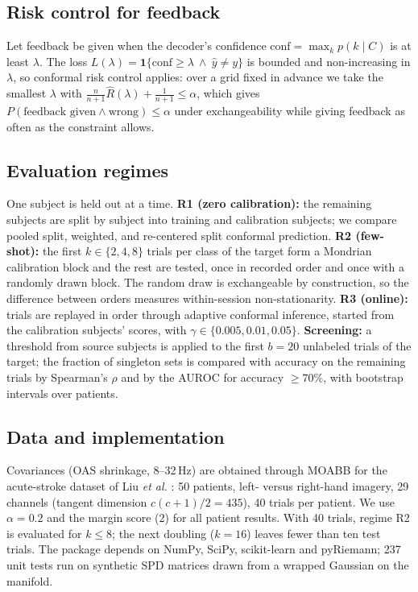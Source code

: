 \documentclass[letterpaper, 10pt, conference]{ieeeconf}
\begin{document}
\subsection{Risk control for feedback}
Let feedback be given when the decoder's confidence
$\mathrm{conf}=\max_k p(k\mid C)$ is at least $\lambda$. The
loss $L(\lambda)=\mathbf 1\{\mathrm{conf}\ge\lambda\ \wedge\ \hat y\ne y\}$ is
bounded and non-increasing in $\lambda$, so conformal risk control
\cite{angelopoulos2024} applies: over a grid fixed in advance we take the smallest
$\lambda$ with $\tfrac{n}{n+1}\hat R(\lambda)+\tfrac{1}{n+1}\le\alpha$, which gives
$P(\text{feedback given}\wedge\text{wrong})\le\alpha$ under exchangeability while
giving feedback as often as the constraint allows.

\subsection{Evaluation regimes}
One subject is held out at a time. \textbf{R1 (zero calibration):} the remaining
subjects are split by subject into training and calibration subjects; we compare
pooled split, weighted, and re-centered split conformal prediction. \textbf{R2
(few-shot):} the first $k\in\{2,4,8\}$ trials per class of the target form a
Mondrian calibration block and the rest are tested, once in recorded order and
once with a randomly drawn block. The random draw is exchangeable by
construction, so the difference between orders measures within-session
non-stationarity. \textbf{R3 (online):} trials are replayed in order through
adaptive conformal inference, started from the calibration subjects' scores,
with $\gamma\in\{0.005,0.01,0.05\}$. \textbf{Screening:} a threshold from source
subjects is applied to the first $b=20$ unlabeled trials of the target; the
fraction of singleton sets is compared with accuracy on the remaining trials by
Spearman's $\rho$ and by the AUROC for accuracy $\ge 70\%$, with bootstrap
intervals over patients.

\subsection{Data and implementation}
Covariances (OAS shrinkage, 8--32\,Hz) are obtained through MOABB
\cite{jayaram2018} for the acute-stroke dataset of Liu \emph{et al.}
\cite{liu2024}: 50 patients, left- versus right-hand imagery, 29 channels
(tangent dimension $c(c+1)/2=435$), 40 trials per patient. We use
$\alpha=0.2$ and the margin score (2) for all patient results. With 40 trials, regime R2 is evaluated for $k\le 8$; the next doubling
($k=16$) leaves fewer than ten test trials. The package depends on NumPy, SciPy,
scikit-learn and pyRiemann;
237 unit tests run on synthetic SPD matrices drawn from a wrapped Gaussian on the
manifold.
\end{document}
